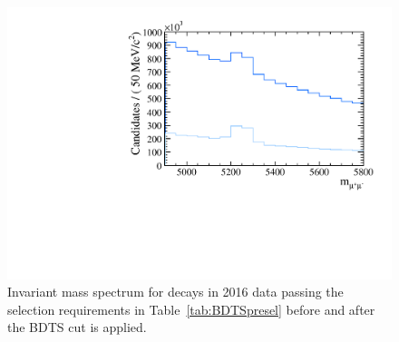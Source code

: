 \begin{figure}[htbp]
    \centering
        \includegraphics[width= 0.6 \textwidth]{./Figs/Selection/2016_BDTS_impact.pdf}
    \caption{Invariant mass spectrum for \bhh decays in 2016 data passing the selection requirements in Table~\ref{tab:BDTSpresel} before and after the BDTS cut is applied.}
    \label{fig:BDTSpreformance}
\end{figure}

